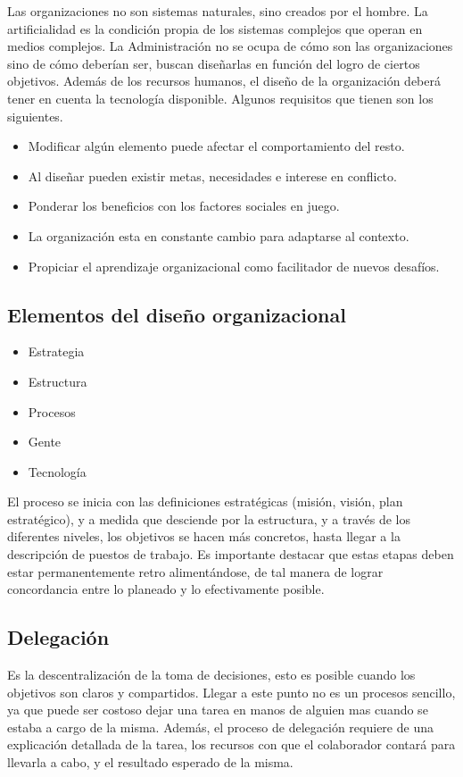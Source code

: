 \documentclass[titlepage,a4paper]{article}
\begin{document}
Las organizaciones no son sistemas naturales, sino creados por el hombre. La artificialidad es la condición propia de los sistemas complejos que operan en medios complejos. La Administración no se ocupa de cómo son las organizaciones sino de cómo deberían ser, buscan diseñarlas en función del logro de ciertos objetivos. Además de los recursos humanos, el diseño de la organización deberá tener en cuenta la tecnología disponible. Algunos requisitos que tienen son los siguientes.
\begin{itemize}
    \item Modificar algún elemento puede afectar el comportamiento del resto.
    \item Al diseñar pueden existir metas, necesidades e interese en conflicto.
    \item Ponderar los beneficios con los factores sociales en juego.
    \item La organización esta en constante cambio para adaptarse al contexto.
    \item Propiciar el aprendizaje organizacional como facilitador de nuevos desafíos.
\end{itemize}

\subsection{Elementos del diseño organizacional}
\begin{itemize} %
    \item Estrategia
    \item Estructura
    \item Procesos
    \item Gente
    \item Tecnología
\end{itemize}

El proceso se inicia con las definiciones estratégicas (misión, visión, plan estratégico), y a medida que desciende por la estructura, y a través de los diferentes niveles, los objetivos se hacen más concretos, hasta llegar a la descripción de puestos de trabajo. Es importante destacar que estas etapas deben estar permanentemente retro alimentándose, de tal manera de lograr concordancia entre lo planeado y lo efectivamente posible.

\subsection{Delegación}
Es la descentralización de la toma de decisiones, esto es posible cuando los objetivos son claros y compartidos. Llegar a este punto no es un procesos sencillo, ya que puede ser costoso dejar una tarea en manos de alguien mas cuando se estaba a cargo de la misma. Además, el proceso de delegación requiere de una explicación detallada de la tarea, los recursos con que el colaborador contará para llevarla a cabo, y el resultado esperado de la misma.
\end{document}
